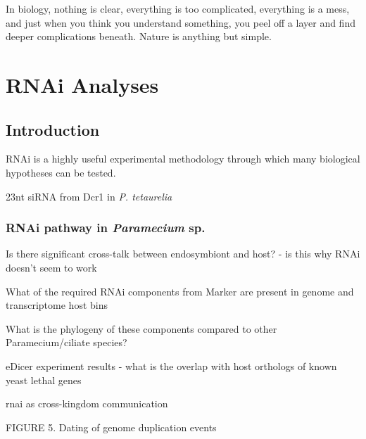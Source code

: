 \graphicspath{{chapters/6.Chapter_4/figures/}}

\begin{savequote}[75mm]
In biology, nothing is clear, everything is too complicated, everything is a mess, 
and just when you think you understand something, you peel off a layer and find 
deeper complications beneath. Nature is anything but simple.
\end{savequote}

\chapter{RNAi Analyses}


\section{Introduction}

RNAi is a highly useful experimental methodology through which
many biological hypotheses can be tested.





23nt siRNA from Dcr1 in \textit{P. tetaurelia} \citep{Lepere2009}



\subsection{RNAi pathway in \textit{Paramecium} sp.}

Is there significant cross-talk between endosymbiont and host? - is this why RNAi doesn't seem to work

What of the required RNAi components from Marker are present in genome and transcriptome host bins

What is the phylogeny of these components compared to other Paramecium/ciliate species?

eDicer experiment results - what is the overlap with host orthologs of known yeast lethal genes

rnai as cross-kingdom communication \citep{Weiberg2015}

FIGURE 5. Dating of genome duplication events







